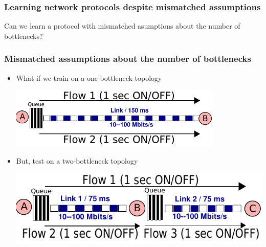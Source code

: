 \begin{frame}
\frametitle{Learning network protocols despite mismatched assumptions}
\begin{centering}
Can we learn a protocol with mismatched asumptions about the number of bottlenecks?
\end{centering}
\end{frame}

\begin{frame}
\frametitle{Mismatched assumptions about the number of bottlenecks}
\large
\begin{centering}

\begin{itemize}
\item<2-> What if we train on a one-bottleneck topology\\
\begin{centering}
\includegraphics[width=0.8\textwidth]{onelink.pdf}
\end{centering}
\item<3-> But, test on a two-bottleneck topology\\
\begin{centering}
\includegraphics[width=0.8 \textwidth]{twolink.pdf}
\end{centering}
\end{itemize}
\end{centering}
\end{frame}

